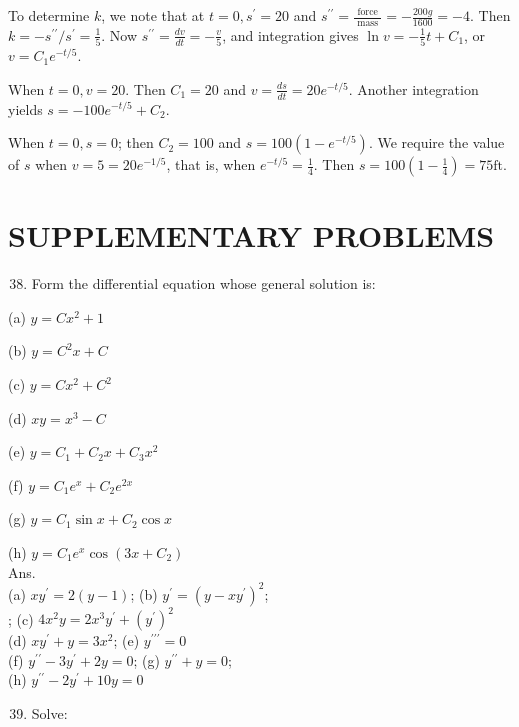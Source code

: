 \documentclass[10pt]{article}
\begin{document}
To determine $k$, we note that at $t=0, s^{\prime}=20$ and $s^{\prime \prime}=\frac{\text { force }}{\text { mass }}=-\frac{200 g}{1600}=-4$. Then $k=-s^{\prime \prime} / s^{\prime}=\frac{1}{5}$. Now $s^{\prime \prime}=\frac{d v}{d t}=-\frac{v}{5}$, and integration gives $\ln v=-\frac{1}{5} t+C_{1}$, or $v=C_{1} e^{-t / 5}$.

When $t=0, v=20$. Then $C_{1}=20$ and $v=\frac{d s}{d t}=20 e^{-t / 5}$. Another integration yields $s=-100 e^{-t / 5}+C_{2}$.

When $t=0, s=0$; then $C_{2}=100$ and $s=100\left(1-e^{-t / 5}\right)$. We require the value of $s$ when $v=5=20 e^{-1 / 5}$, that is, when $e^{-t / 5}=\frac{1}{4}$. Then $s=100\left(1-\frac{1}{4}\right)=75 \mathrm{ft}$.

\section*{SUPPLEMENTARY PROBLEMS}
\begin{enumerate}
  \setcounter{enumi}{37}
  \item Form the differential equation whose general solution is:
\end{enumerate}

(a) $y=C x^{2}+1$

(b) $y=C^{2} x+C$

(c) $y=C x^{2}+C^{2}$

(d) $x y=x^{3}-C$

(e) $y=C_{1}+C_{2} x+C_{3} x^{2}$

(f) $y=C_{1} e^{x}+C_{2} e^{2 x}$

(g) $y=C_{1} \sin x+C_{2} \cos x$

(h) $y=C_{1} e^{x} \cos \left(3 x+C_{2}\right)$\\
Ans.\\
(a) $x y^{\prime}=2(y-1)$; (b) $y^{\prime}=\left(y-x y^{\prime}\right)^{2}$;\\
; (c) $4 x^{2} y=2 x^{3} y^{\prime}+\left(y^{\prime}\right)^{2}$\\
(d) $x y^{\prime}+y=3 x^{2}$; (e) $y^{\prime \prime \prime}=0$\\
(f) $y^{\prime \prime}-3 y^{\prime}+2 y=0$; (g) $y^{\prime \prime}+y=0$;\\
(h) $y^{\prime \prime}-2 y^{\prime}+10 y=0$

\begin{enumerate}
  \setcounter{enumi}{38}
  \item Solve:
\end{enumerate}
\end{document}
